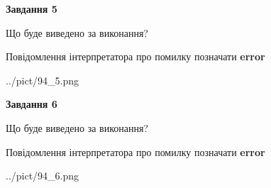 \documentclass[12pt, ukrainian]{article}
\begin{document}
{{\begin {center}\textbf{Завдання 5}\end {center}}\par
Що буде виведено за виконання? \par
Повідомлення інтерпретатора про помилку позначати \textbf{error}

\begin{center}
	{../pict/94_5.png}
\end{center}
\newpage

{\begin {center}\textbf{Завдання 6}\end {center}}\par
Що буде виведено за виконання? \par
Повідомлення інтерпретатора про помилку позначати \textbf{error}

\begin{center}
	{../pict/94_6.png}
\end{center}
\newpage

}
\end{document}
